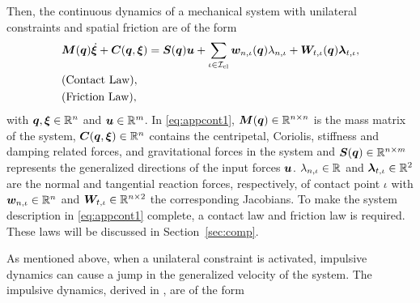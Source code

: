 \documentclass[../DC2017114Bouma.tex]{subfiles}
\begin{document}
Then, the continuous dynamics of a mechanical system with unilateral constraints and spatial friction are of the form
\begin{align}
&{\boldsymbol{M}}({\boldsymbol{q}})\dot{\boldsymbol{\xi}} + {\boldsymbol{C}}({\boldsymbol{q}},\boldsymbol{\xi}) = {\boldsymbol{S}}({\boldsymbol{q}}){\boldsymbol{u}} + \sum_{\iota\in\mathcal{I}_{\text{cl}}}{\boldsymbol{w}}_{n,\iota}({\boldsymbol{q}})\lambda_{n,\iota} + {\boldsymbol{W}}_{t,\iota}({\boldsymbol{q}})\boldsymbol{\lambda}_{t,\iota}, \label{eq:appcont1}\\
&\text{(Contact Law)},\nonumber\\
&\text{(Friction Law)},\nonumber
\end{align}
%
%
%
%
%
%
%
with ${\boldsymbol{q}},\boldsymbol{\xi}\in\mathbb{R}^{n}$ and ${\boldsymbol{u}}\in\mathbb{R}^m$. In \eqref{eq:appcont1}, ${\boldsymbol{M}}({\boldsymbol{q}})\in\mathbb{R}^{n\times n}$ is the mass matrix of the system, ${\boldsymbol{C}}({\boldsymbol{q}},\boldsymbol{\xi})\in\mathbb{R}^{n}$ contains the centripetal, Coriolis, stiffness and damping related forces, and gravitational forces in the system and ${\boldsymbol{S}}({\boldsymbol{q}})\in\mathbb{R}^{n\times m}$ represents the generalized directions of the input forces ${\boldsymbol{u}}$. $\lambda_{n,\iota}\in\mathbb{R}$ and $\boldsymbol{\lambda}_{t,\iota}\in\mathbb{R}^{2}$ are the normal and tangential reaction forces, respectively, of contact point $\iota$ with ${\boldsymbol{w}}_{n,\iota}\in\mathbb{R}^{n}$ and ${\boldsymbol{W}}_{t,\iota}\in\mathbb{R}^{n\times 2}$ the corresponding Jacobians. To make the system description in \eqref{eq:appcont1} complete, a contact law and friction law is required. These laws will be discussed in Section~\ref{sec:comp}.

As mentioned above, when a unilateral constraint is activated, impulsive dynamics can cause a jump in the generalized velocity of the system. The impulsive dynamics, derived in \cite[Section 5.4]{Leine2008}, are of the form
\end{document}
